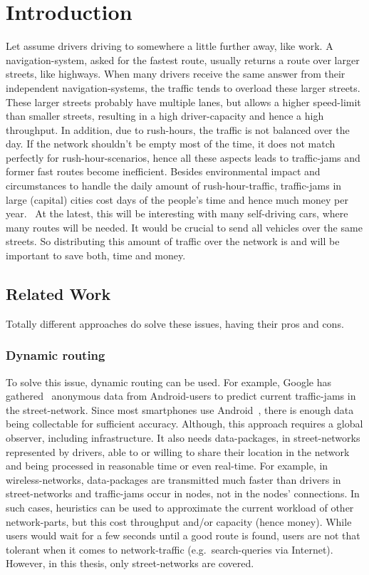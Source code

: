 \chapter{Introduction}
\label{chap:introduction}

Let assume drivers driving to somewhere a little further away, like work.
A navigation-system, asked for the fastest route, usually returns a route over larger streets, like highways.
When many drivers receive the same answer from their independent navigation-systems, the traffic tends to overload these larger streets.
These larger streets probably have multiple lanes, but allows a higher speed-limit than smaller streets, resulting in a high driver-capacity and hence a high throughput.
In addition, due to rush-hours, the traffic is not balanced over the day.
If the network shouldn't be empty most of the time, it does not match perfectly for rush-hour-scenarios, hence all these aspects leads to traffic-jams and former fast routes become inefficient.
Besides environmental impact and circumstances to handle the daily amount of rush-hour-traffic, traffic-jams in large (capital) cities cost days of the people's time and hence much money per year.~\cite{inrix:traffic-cost}
At the latest, this will be interesting with many self-driving cars, where many routes will be needed.
It would be crucial to send all vehicles over the same streets.
So distributing this amount of traffic over the network is and will be important to save both, time and money.

\section{Related Work}

    Totally different approaches do solve these issues, having their pros and cons.

    \subsection{Dynamic routing}

        To solve this issue, dynamic routing can be used.
        For example, Google has gathered~\cite{barth:google-traffic} anonymous data from Android-users to predict current traffic-jams in the street-network.
        Since most smartphones use Android~\cite{kantar:android-vs-ios}, there is enough data being collectable for sufficient accuracy.
        Although, this approach requires a global observer, including infrastructure.
        It also needs data-packages, in street-networks represented by drivers, able to or willing to share their location in the network and being processed in reasonable time or even real-time.
        For example, in wireless-networks, data-packages are transmitted much faster than drivers in street-networks and traffic-jams occur in nodes, not in the nodes' connections.
        In such cases, heuristics can be used to approximate the current workload of other network-parts, but this cost throughput and/or capacity (hence money).
        While users would wait for a few seconds until a good route is found, users are not that tolerant when it comes to network-traffic (e.g.\ search-queries via Internet).
        However, in this thesis, only street-networks are covered.

